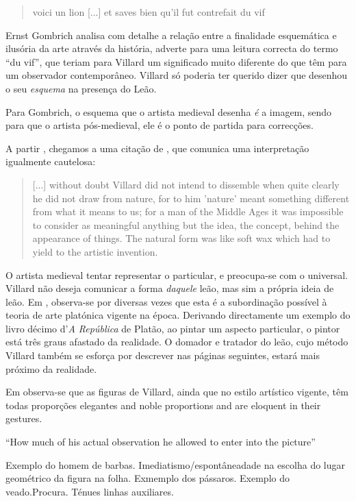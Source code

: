 \documentclass{article}
\begin{document}
\begin{quote}
  voici un lion [...] et saves bien qu'il fut contrefait du vif
\end{quote}

Ernst Gombrich analisa com detalhe a relação entre a finalidade
esquemática e ilusória da arte através da história, adverte para uma
leitura correcta do termo ``du vif'', que teriam para Villard um
significado muito diferente do que têm para um observador
contemporâneo. Villard só poderia ter querido dizer que desenhou o seu
\emph{esquema} na presença do Leão. \cite[p. 68]{gombrich}

Para Gombrich, o esquema que o artista medieval desenha \emph{é} a
imagem, sendo para que o artista pós-medieval, ele é o ponto de
partida para correcções. \cite[p. 68]{gombrich}

A partir \cite{teresa}, chegamos a uma citação de \cite{schlosser},
que comunica uma interpretação igualmente cautelosa:
 \begin{quote}
  [...] without doubt Villard did not intend to dissemble when quite
  clearly he did not draw from nature, for to him 'nature' meant
  something different from what it means to us; for a man of the
  Middle Ages it was impossible to consider as meaningful anything but
  the idea, the concept, behind the appearance of things. The natural
  form was like soft wax which had to yield to the artistic invention.
 \end{quote}

O artista medieval tentar representar o particular, e preocupa-se com
o universal. Villard não deseja comunicar a forma \emph{daquele} leão,
mas sim a própria ideia de leão. Em \cite{gombrich}, observa-se por
diversas vezes que esta é a subordinação possível à teoria de arte
platónica vigente na época. Derivando directamente um exemplo do livro
décimo d'\emph{A República} de Platão, ao pintar um aspecto
particular, o pintor está três graus afastado da realidade. O domador
e tratador do leão, cujo método Villard também se esforça por
descrever nas páginas seguintes, estará mais próximo da
realidade.

Em \cite{teresa} observa-se que as figuras de Villard, ainda que no
estilo artístico vigente, têm todas proporções elegantes and noble
proportions and are eloquent in their gestures.

\cite{gombrich} ``How much of his actual observation he allowed to
enter into the picture''

Exemplo do homem de barbas. Imediatismo/espontâneadade na escolha do
lugar geométrico da figura na folha. Exmemplo dos pássaros. Exemplo do
veado.Procura. Ténues linhas auxiliares.
\end{document}
